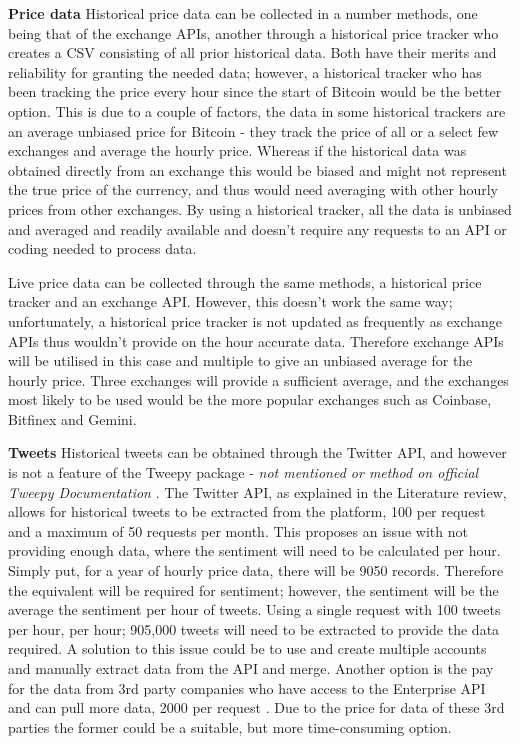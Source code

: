 \documentclass[oneside, 12pt]{article}
\begin{document}
		\textbf{Price data}
		\newline
		\newline
		Historical price data can be collected in a number methods, one being that of the exchange APIs, another through a historical price tracker who creates a CSV consisting of all prior historical data. Both have their merits and reliability for granting the needed data; however, a historical tracker who has been tracking the price every hour since the start of Bitcoin would be the better option. This is due to a couple of factors, the data in some historical trackers are an average unbiased price for Bitcoin - they track the price of all or a select few exchanges and average the hourly price. Whereas if the historical data was obtained directly from an exchange this would be biased and might not represent the true price of the currency, and thus would need averaging with other hourly prices from other exchanges. By using a historical tracker, all the data is unbiased and averaged and readily available and doesn't require any requests to an API or coding needed to process data.
		
		Live price data can be collected through the same methods, a historical price tracker and an exchange API. However, this doesn't work the same way; unfortunately, a historical price tracker is not updated as frequently as exchange APIs thus wouldn't provide on the hour accurate data. Therefore exchange APIs will be utilised in this case and multiple to give an unbiased average for the hourly price. Three exchanges will provide a sufficient average, and the exchanges most likely to be used would be the more popular exchanges such as Coinbase, Bitfinex and Gemini.
		\newline
		
		\textbf{Tweets}
		\newline
		\newline
		Historical tweets can be obtained through the Twitter API, and however is not a feature of the Tweepy package - \textit{not mentioned or method on official Tweepy Documentation} \cite{TweepyDoc}. The Twitter API, as explained in the Literature review, allows for historical tweets to be extracted from the platform, 100 per request and a maximum of 50 requests per month. This proposes an issue with not providing enough data, where the sentiment will need to be calculated per hour. Simply put, for a year of hourly price data, there will be 9050 records. Therefore the equivalent will be required for sentiment; however, the sentiment will be the average the sentiment per hour of tweets. Using a single request with 100 tweets per hour, per hour; 905,000 tweets will need to be extracted to provide the data required. A solution to this issue could be to use and create multiple accounts and manually extract data from the API and merge. Another option is the pay for the data from 3rd party companies who have access to the Enterprise API and can pull more data, 2000 per request \cite{SearchTweets}\cite{ConStream}. Due to the price for data of these 3rd parties the former could be a suitable, but more time-consuming option. 
		
\end{document}
